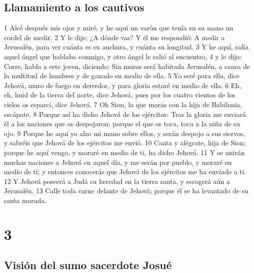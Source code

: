 \section*{Llamamiento a los cautivos}

1 Alcé después mis ojos y miré, y he aquí un varón que tenía en su mano un cordel de medir.
2 Y le dije: ¿A dónde vas? Y él me respondió: A medir a Jerusalén, para ver cuánta es su anchura, y cuánta su longitud.
3 Y he aquí, salía aquel ángel que hablaba conmigo, y otro ángel le salió al encuentro,
4 y le dijo: Corre, habla a este joven, diciendo: Sin muros será habitada Jerusalén, a causa de la multitud de hombres y de ganado en medio de ella.
5 Yo seré para ella, dice Jehová, muro de fuego en derredor, y para gloria estaré en medio de ella.
6 Eh, eh, huid de la tierra del norte, dice Jehová, pues por los cuatro vientos de los cielos os esparcí, dice Jehová.
7 Oh Sion, la que moras con la hija de Babilonia, escápate.
8 Porque así ha dicho Jehová de los ejércitos: Tras la gloria me enviará él a las naciones que os despojaron; porque el que os toca, toca a la niña de su ojo.
9 Porque he aquí yo alzo mi mano sobre ellos, y serán despojo a sus siervos, y sabréis que Jehová de los ejércitos me envió.
10 Canta y alégrate, hija de Sion; porque he aquí vengo, y moraré en medio de ti, ha dicho Jehová.
11 Y se unirán muchas naciones a Jehová en aquel día, y me serán por pueblo, y moraré en medio de ti; y entonces conocerás que Jehová de los ejércitos me ha enviado a ti.
12 Y Jehová poseerá a Judá su heredad en la tierra santa, y escogerá aún a Jerusalén.
13 Calle toda carne delante de Jehová; porque él se ha levantado de su santa morada.

\chapter{3}

\section*{Visión del sumo sacerdote Josué}

